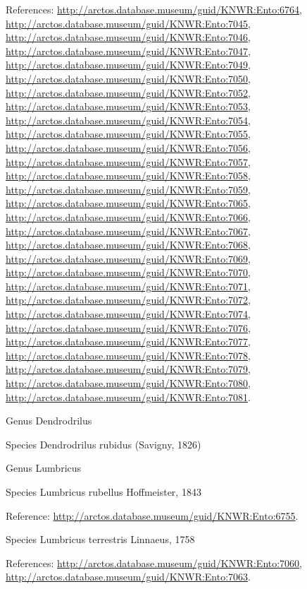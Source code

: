 \documentclass[9pt, article]{memoir}
\begin{document}
\begin{multicols}{2}
\vspace{6pt}References: 
\url{http://arctos.database.museum/guid/KNWR:Ento:6764}, 
\url{http://arctos.database.museum/guid/KNWR:Ento:7045}, 
\url{http://arctos.database.museum/guid/KNWR:Ento:7046}, 
\url{http://arctos.database.museum/guid/KNWR:Ento:7047}, 
\url{http://arctos.database.museum/guid/KNWR:Ento:7049}, 
\url{http://arctos.database.museum/guid/KNWR:Ento:7050}, 
\url{http://arctos.database.museum/guid/KNWR:Ento:7052}, 
\url{http://arctos.database.museum/guid/KNWR:Ento:7053}, 
\url{http://arctos.database.museum/guid/KNWR:Ento:7054}, 
\url{http://arctos.database.museum/guid/KNWR:Ento:7055}, 
\url{http://arctos.database.museum/guid/KNWR:Ento:7056}, 
\url{http://arctos.database.museum/guid/KNWR:Ento:7057}, 
\url{http://arctos.database.museum/guid/KNWR:Ento:7058}, 
\url{http://arctos.database.museum/guid/KNWR:Ento:7059}, 
\url{http://arctos.database.museum/guid/KNWR:Ento:7065}, 
\url{http://arctos.database.museum/guid/KNWR:Ento:7066}, 
\url{http://arctos.database.museum/guid/KNWR:Ento:7067}, 
\url{http://arctos.database.museum/guid/KNWR:Ento:7068}, 
\url{http://arctos.database.museum/guid/KNWR:Ento:7069}, 
\url{http://arctos.database.museum/guid/KNWR:Ento:7070}, 
\url{http://arctos.database.museum/guid/KNWR:Ento:7071}, 
\url{http://arctos.database.museum/guid/KNWR:Ento:7072}, 
\url{http://arctos.database.museum/guid/KNWR:Ento:7074}, 
\url{http://arctos.database.museum/guid/KNWR:Ento:7076}, 
\url{http://arctos.database.museum/guid/KNWR:Ento:7077}, 
\url{http://arctos.database.museum/guid/KNWR:Ento:7078}, 
\url{http://arctos.database.museum/guid/KNWR:Ento:7079}, 
\url{http://arctos.database.museum/guid/KNWR:Ento:7080}, 
\url{http://arctos.database.museum/guid/KNWR:Ento:7081}.

\vspace{6pt}\noindent\hspace{30pt}Genus Dendrodrilus


\vspace{6pt}\noindent\hspace{36pt}Species Dendrodrilus rubidus (Savigny, 1826)


\vspace{6pt}\noindent\hspace{30pt}Genus Lumbricus


\vspace{6pt}\noindent\hspace{36pt}Species Lumbricus rubellus Hoffmeister, 1843


\vspace{6pt}Reference: 
\url{http://arctos.database.museum/guid/KNWR:Ento:6755}.

\vspace{6pt}\noindent\hspace{36pt}Species Lumbricus terrestris Linnaeus, 1758


\vspace{6pt}References: 
\url{http://arctos.database.museum/guid/KNWR:Ento:7060}, 
\url{http://arctos.database.museum/guid/KNWR:Ento:7063}.

\end{multicols}
\end{document}
